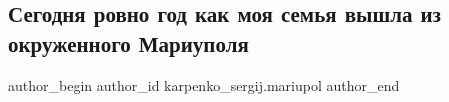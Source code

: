  
 
 
 
 

\subsection{Сегодня ровно год как моя семья вышла из окруженного Мариуполя}
\label{sec:16_03_2023.fb.karpenko_sergij.mariupol.1.segodnya_rovno_god_k}

\ifcmt
 author_begin
   author_id karpenko_sergij.mariupol
 author_end
\fi


